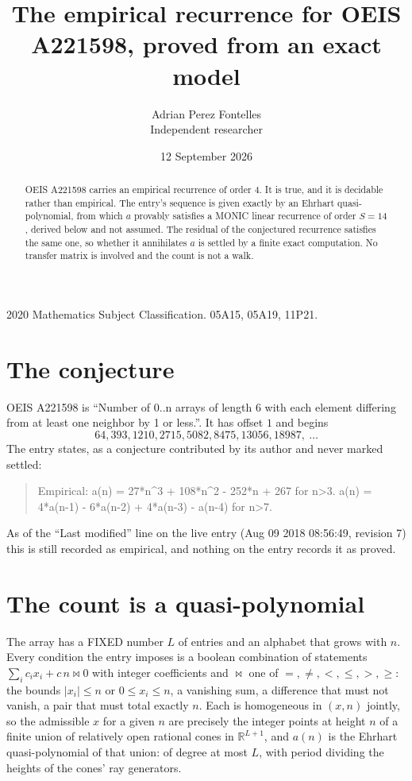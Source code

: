 \documentclass[11pt,a4paper]{article}
\title{The empirical recurrence for OEIS A221598, proved from an exact model}
\author{Adrian Perez Fontelles\\ \small Independent researcher}
\date{12 September 2026}
\theoremstyle{plain}
\theoremstyle{definition}
\begin{document}
\maketitle

\begin{abstract}
OEIS A221598 carries an empirical recurrence of order $4$. It is true, and it is
decidable rather than empirical. The entry's sequence is given exactly by an Ehrhart quasi-polynomial, from
which $a$ provably satisfies a MONIC linear recurrence of order $S=14$, derived below and not
assumed. The residual of the conjectured recurrence satisfies the same one, so whether it
annihilates $a$ is settled by a finite exact computation. No transfer matrix is involved and
the count is not a walk.
\end{abstract}

\noindent\small 2020 Mathematics Subject Classification. 05A15, 05A19, 11P21.\normalsize

\section{The conjecture}

OEIS A221598 is ``Number of 0..n arrays of length 6 with each element differing from at least one neighbor by 1 or less.''. It has offset $1$ and begins
\[
64, 393, 1210, 2715, 5082, 8475, 13056, 18987,\ \dots
\]
The entry states, as a conjecture contributed by its author and never marked settled:
\begin{quote}
Empirical: a(n) = 27*n\^{}3 + 108*n\^{}2 - 252*n + 267 for n>3. a(n) = 4*a(n-1) - 6*a(n-2) + 4*a(n-3) - a(n-4) for n>7.
\end{quote}
As of the ``Last modified'' line on the live entry (Aug 09 2018 08:56:49, revision 7)
this is still recorded as empirical, and nothing on the entry records it as proved.

\section{The count is a quasi-polynomial}

The array has a FIXED number $L$ of entries and an alphabet that grows with $n$. Every
condition the entry imposes is a boolean combination of statements
$\sum_i c_ix_i + c\,n \bowtie 0$ with integer coefficients and $\bowtie$ one of
$=,\ne,<,\le,>,\ge$: the bounds $|x_i|\le n$ or $0\le x_i\le n$, a vanishing sum, a difference
that must not vanish, a pair that must total exactly $n$. Each is homogeneous in $(x,n)$
jointly, so the admissible $x$ for a given $n$ are precisely the integer points at height $n$
of a finite union of relatively open rational cones in $\mathbb{R}^{L+1}$, and $a(n)$ is
the Ehrhart quasi-polynomial of that union: of degree at most $L$, with period dividing the
heights of the cones' ray generators.
\end{document}
